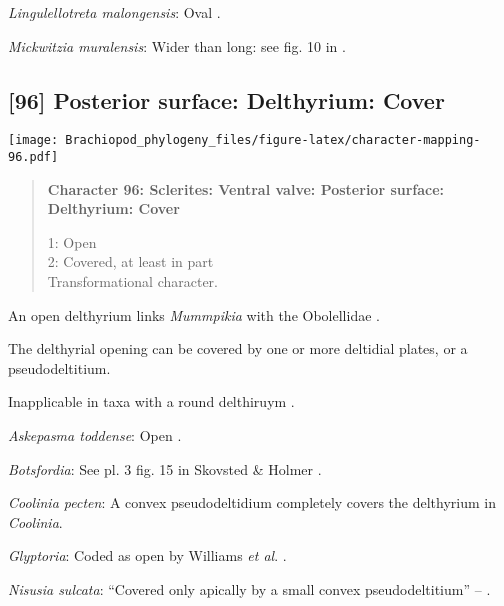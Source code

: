 \documentclass[openany]{book}
\theoremstyle{definition}
\theoremstyle{definition}
\theoremstyle{definition}
\theoremstyle{remark}
\begin{document}
\hypertarget{Lingulellotreta_malongensis-coding-95}{}
\emph{Lingulellotreta malongensis}: Oval
\citep{Williams2000LinguliformeaCraniiformea}.

\hypertarget{Mickwitzia_muralensis-coding-95}{}
\emph{Mickwitzia muralensis}: Wider than long: see fig. 10 in
\citet{Balthasar2004Shellstructure}.

\subsection*{{[}96{]} Posterior surface: Delthyrium:
Cover}\label{posterior-surface-delthyrium-cover}

\texttt{[image: Brachiopod\_phylogeny\_files/figure-latex/character-mapping-96.pdf]}

\begin{quote}
\textbf{Character 96: Sclerites: Ventral valve: Posterior surface:
Delthyrium: Cover}

1: Open\\
2: Covered, at least in part\\
Transformational character.
\end{quote}

An open delthyrium links \emph{Mummpikia} with the Obolellidae
\citep{Balthasar2008iMummpikia}.

The delthyrial opening can be covered by one or more deltidial plates,
or a pseudodeltitium.

Inapplicable in taxa with a round delthiruym \citep[generated by
overgrowth of the delthyrial opening by posterolateral parts of the
shell, per][]{Popov1992TheCambrian}.

\hypertarget{Askepasma_toddense-coding-96}{}
\emph{Askepasma toddense}: Open \citep{Topper2013Theoldest}.

\hypertarget{Botsfordia-coding-96}{}
\emph{Botsfordia}: See pl. 3 fig. 15 in Skovsted \& Holmer
\citeyearpar{Skovsted2005EarlyCambrian}.

\hypertarget{Coolinia_pecten-coding-96}{}
\emph{Coolinia pecten}: A convex pseudodeltidium completely covers the
delthyrium in \emph{Coolinia}.

\hypertarget{Glyptoria-coding-96}{}
\emph{Glyptoria}: Coded as open by Williams \emph{et al}.
\citeyearpar{Williams1998Thediversity}.

\hypertarget{Nisusia_sulcata-coding-96}{}
\emph{Nisusia sulcata}: ``Covered only apically by a small convex
pseudodeltitium'' -- \citet{Holmer2018Evolutionarysignificance}.
\end{document}
